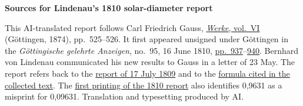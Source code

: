 \clearpage\thispagestyle{empty}
\begin{center}\textbf{Sources for Lindenau’s 1810 solar-diameter report}\end{center}
\noindent This AI-translated report follows Carl Friedrich Gauss, \href{https://gdz.sub.uni-goettingen.de/id/PPN236007467}{\emph{Werke}, vol.~VI} (Göttingen, 1874), pp.~525–526. It first appeared unsigned under Göttingen in the \emph{Göttingische gelehrte Anzeigen}, no.~95, 16 June 1810, \href{https://images.p.sub.uni-goettingen.de/iiif/image/gdz:PPN319721507_1810:00000969/full/1650,/0/default.jpg}{pp.~937}–\href{https://images.p.sub.uni-goettingen.de/iiif/image/gdz:PPN319721507_1810:00000972/full/1650,/0/default.jpg}{940}. Bernhard von Lindenau communicated his new results to Gauss in a letter of 23 May. The report refers back to the \hyperlink{native-524-lower}{report of 17 July 1809} and to the \hyperlink{native-518}{formula cited in the collected text}. The \href{https://images.p.sub.uni-goettingen.de/iiif/image/gdz:PPN319721507_1810:00000970/full/1650,/0/default.jpg}{first printing of the 1810 report} also identifies 0,9631 as a misprint for 0,09631. Translation and typesetting produced by AI.
\clearpage
